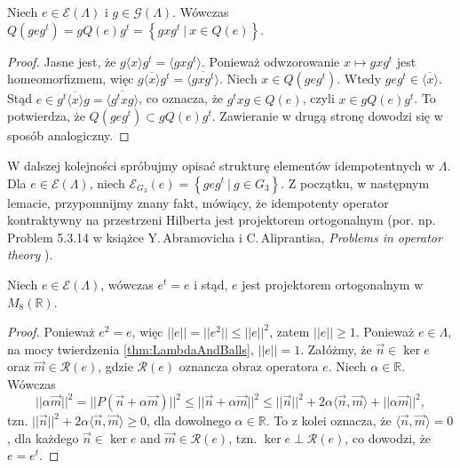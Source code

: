 \begin{Lemma}
    \label{lem:equivClassesOfQe}
    Niech $e \in \mathcal{E}(\Lambda)$ i $g \in \mathcal{G}(\Lambda)$.
    Wówczas $Q(g e g^{t}) = g Q(e) g^{t} =
    \left \{ g x g^{t} \: | \: x \in Q(e) \right \}$.
\end{Lemma}
\begin{proof}
    Jasne jest, że $g \langle x \rangle g^{t} = \langle g x g^{t} \rangle$.
Ponieważ odwzorowanie $x \mapsto g x g^{t}$ jest homeomorfizmem,
więc $g \overline{\langle x \rangle} g^{t} = \overline{\langle g x g^{t} \rangle}$.
Niech $x \in Q(g e g^{t})$.
Wtedy $g e g^{t} \in \overline{\langle x \rangle}$.
Stąd $e \in g^{t} \overline{\langle x \rangle} g = \overline{\langle g^{t} x g \rangle}$,
co oznacza, że $g^{t} x g \in Q(e)$, czyli
    $x \in g Q(e) g^{t}$.
To potwierdza, że
    $Q(g e g^{t}) \subset g Q(e) g^{t}$.
Zawieranie w drugą stronę dowodzi się w sposób analogiczny.
\end{proof}

W dalszej kolejności spróbujmy opisać strukturę elementów idempotentnych w $\Lambda$.
Dla $e \in \mathcal{E}(\Lambda)$,
niech $\mathcal{E}_{G_{3}}(e) = \left \{ g e g^{t} \: | \: g \in G_{3} \right \}$.
Z początku, w następnym lemacie, przypomnijmy znany fakt,
mówiący, że idempotenty operator kontraktywny na przestrzeni Hilberta
jest projektorem ortogonalnym
(por. np. Problem 5.3.14 w książce
Y.\,Abramovicha i  C.\,Aliprantisa,
\emph{Problems in operator theory}
\cite{Abramovich2002}).
\begin{Lemma}
    \label{lem:eIsProj}
    Niech $e \in \mathcal{E}(\Lambda)$, wówczas $e^{t} = e$ i stąd,
    $e$ jest projektorem ortogonalnym w $M_{8}(\mathbb{R})$.
\end{Lemma}
\begin{proof}
    Ponieważ $e^{2} = e$, więc $||e|| = ||e^{2}|| \leq ||e||^{2}$,
    zatem $||e|| \geq 1$.
    Ponieważ $e \in \Lambda$, na mocy twierdzenia \ref{thm:LambdaAndBalls},
    $||e|| =1$.
Załóżmy, że $\vec{n} \in \ker e$ oraz $\vec{m} \in \mathcal{R}(e)$,
gdzie $\mathcal{R}(e)$ oznancza obraz operatora $e$.
Niech $\alpha \in \mathbb{R}$.
Wówczas
\begin{equation}
    || \alpha \vec{m} ||^{2} = || P (\vec{n} + \alpha \vec{m}) ||^{2} \leq
    || \vec{n} + \alpha \vec{m}||^{2} \leq ||\vec{n}||^{2} +
        2 \alpha \langle \vec{n}, \vec{m} \rangle + || \alpha \vec{m}||^{2},
\end{equation}
tzn. $||\vec{n}||^{2} + 2 \alpha  \langle \vec{n}, \vec{m} \rangle \geq 0$,
dla dowolnego $\alpha \in \mathbb{R}$.
To z kolei oznacza, że
$\langle \vec{n}, \vec{m} \rangle = 0$,
dla każdego  $\vec{n} \in \ker e$ and $\vec{m} \in \mathcal{R}(e)$,
tzn.
$\ker e \perp \mathcal{R}(e)$, co dowodzi, że $e = e^{t}$.
\end{proof}

